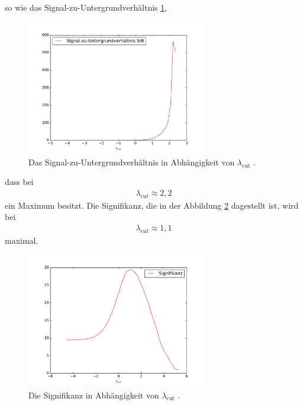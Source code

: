 so wie das Signal-zu-Untergrundverhältnis \ref{fig:verh},
\begin{figure}
  \centering
  \includegraphics[width=0.7\textwidth]{verhaeltnis_h).pdf}
  \caption{Das Signal-zu-Untergrundverhältnis in Abhängigkeit von $\lambda_\text{cut}$ .}
  \label{fig:verh}
\end{figure}
dass bei
\begin{align}
  \lambda_{cut}\approx2,2
\end{align}
ein Maximum besitzt.
Die Signifikanz, die in der Abbildung \ref{fig:sigh} dagestellt ist, wird bei
\begin{align}
  \lambda_{cut}\approx1,1
\end{align}
maximal.
\begin{figure}
  \centering
  \includegraphics[width=0.7\textwidth]{Signifikanz_h).pdf}
  \caption{Die Signifikanz in Abhängigkeit von $\lambda_\text{cut}$ .}
  \label{fig:sigh}
\end{figure}
